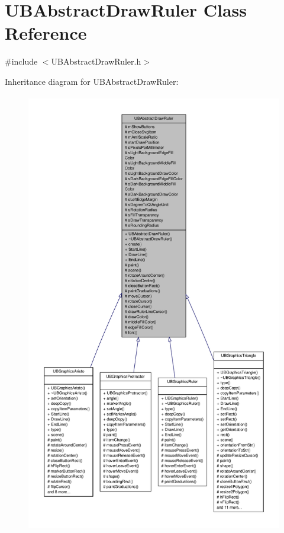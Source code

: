 \hypertarget{class_u_b_abstract_draw_ruler}{\section{U\-B\-Abstract\-Draw\-Ruler Class Reference}
\label{d0/de1/class_u_b_abstract_draw_ruler}
}


{\ttfamily \#include $<$U\-B\-Abstract\-Draw\-Ruler.\-h$>$}



Inheritance diagram for U\-B\-Abstract\-Draw\-Ruler\-:
\nopagebreak
\begin{figure}[H]
\begin{center}
\leavevmode
\includegraphics[height=550pt]{da/d8d/class_u_b_abstract_draw_ruler__inherit__graph}
\end{center}
\end{figure}


